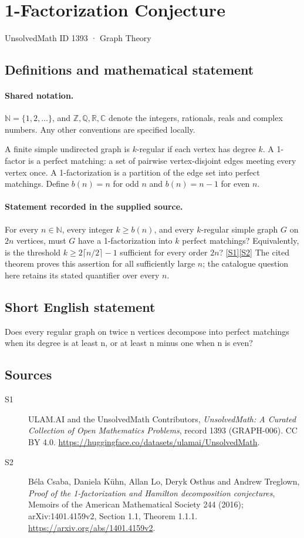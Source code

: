 \documentclass[11pt]{article}
\newcommand{\sref}[2]{\hyperlink{source:#1:#2}{[S#2]}}
\begin{document}
\setcounter{section}{1392}
\section{1-Factorization Conjecture}\label{1393}
{\small\sffamily UnsolvedMath ID 1393 · Graph Theory}
\subsection{Definitions and mathematical statement}

\paragraph{Shared notation.}$\mathbb N=\{1,2,\ldots\}$, and $\mathbb Z,\mathbb Q,\mathbb R,\mathbb C$ denote the integers, rationals, reals and complex numbers. Any other conventions are specified locally.


A finite simple undirected graph is $k$-regular if each vertex has degree $k$. A 1-factor is a perfect matching: a set of pairwise vertex-disjoint edges meeting every vertex once. A 1-factorization is a partition of the edge set into perfect matchings. Define $b(n)=n$ for odd $n$ and $b(n)=n-1$ for even $n$.
\paragraph{Statement recorded in the supplied source.}
For every $n\in\mathbb N$, every integer $k\ge b(n)$, and every $k$-regular simple graph $G$ on $2n$ vertices, must $G$ have a 1-factorization into $k$ perfect matchings? Equivalently, is the threshold $k\ge2\lceil n/2\rceil-1$ sufficient for every order $2n$? \sref{1393}{1}\sref{1393}{2}
The cited theorem proves this assertion for all sufficiently large $n$; the catalogue question here retains its stated quantifier over every $n$.
\subsection{Short English statement}
Does every regular graph on twice n vertices decompose into perfect matchings when its degree is at least n, or at least n minus one when n is even?
\subsection{Sources}
\begin{description}
\item[\hypertarget{source:1393:1}{S1}] ULAM.AI and the UnsolvedMath Contributors, \emph{UnsolvedMath: A Curated Collection of Open Mathematics Problems}, record 1393 (GRAPH-006). CC BY 4.0. \url{https://huggingface.co/datasets/ulamai/UnsolvedMath}.
\item[\hypertarget{source:1393:2}{S2}] Béla Csaba, Daniela Kühn, Allan Lo, Deryk Osthus and Andrew Treglown, \emph{Proof of the 1-factorization and Hamilton decomposition conjectures}, Memoirs of the American Mathematical Society 244 (2016); arXiv:1401.4159v2, Section 1.1, Theorem 1.1.1. \url{https://arxiv.org/abs/1401.4159v2}.
\end{description}
\label{end:1393}
\end{document}
